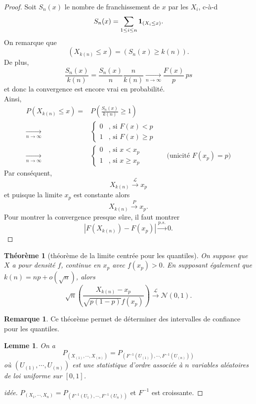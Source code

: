 \documentclass[10p,a4paper,reqno,titlepage]{report}
\newcommand{\indic}{\mathrm{{\bf 1}}}
\newcounter{dader}[chapter]
\theoremstyle{plain}
\newtheorem{thm}[thms]{Théorème}
\newtheorem{lemme}[dader]{Lemme}%
\theoremstyle{definition}
\newtheorem{rem}[dader]{Remarque}
\newcommand{\vabs}[1]{\left\vert #1 \right\vert}
\newcommand{\cvps}{\stackrel{p.s.}{\longrightarrow}}
\newcommand{\cvP}{\stackrel{P}{\longrightarrow}}
\newcommand{\cvloi}{\stackrel{\mathcal{L}}{\longrightarrow}}
\begin{document}
\begin{proof}
	Soit $S_n (x)$ le nombre de franchissement de $x$ par les $X_i$, c-à-d
	$$S_n (x)= \sum_{1\leq i \leq n} \indic_{(X_i \leq x)}.$$
	On remarque que 
	$$ (X_{k(n)}\leq x )= (S_n (x) \geq k (n)).$$
	De plus,
	$$ \frac{S_n (x)}{k(n)}= \frac{S_n(x)}{n}\frac{n}{k(n)}\underset{n\to\infty}{\longrightarrow} \frac{F(x)}{p} \,ps$$
	et donc la convergence est encore vrai en probabilité.\\
	Ainsi,
	\begin{align*}
		P(X_{k(n)} \leq x) = & P\left(\frac{S_n(x)}{k(n)}\geq 1\right)\\
		 \underset{n\to\infty}{\longrightarrow} & \left\{\begin{array}{ll}
		 	0 & \text{, si }F(x)< p \\ 1 & \text{, si }F(x)\geq p
		 \end{array}\right.\\
	 \underset{n\to\infty}{\longrightarrow} & \left\{\begin{array}{ll}
	 	0 & \text{, si }x< x_p \\ 1 & \text{, si }x\geq x_p
	 \end{array}\right. && \text{(unicité $F(x_p)=p$)}
	\end{align*}
Par conséquent,
$$ X_{k(n)} \cvloi x_p$$
et puisque la limite $x_p$ est constante alors 
$$ X_{k(n)} \cvP x_p .$$
Pour montrer la convergence presque sûre, il faut montrer 
$$ \vabs{F(X_{k(n)}) -F(x_p)} \cvps 0.$$
\end{proof}
\begin{thm}[théorème de la limite centrée pour les quantiles]
	On suppose que $X$ a pour densité $f$, continue en $x_p$ avec $f(x_p)>0$. En supposant également que $k(n)= np+o(\sqrt{n})$, alors 
	$$ \sqrt{n} \left(\frac{X_{k(n)}-x_p}{\sqrt{p(1-p)} f(x_p)}\right)\cvloi \mathcal N (0,1).$$
\end{thm}
\begin{rem}
	Ce théorème permet de déterminer des intervalles de confiance pour les quantiles.
\end{rem}
\begin{lemme}
	On a 
	$$P_{(X_(1),\cdots, X_{(n)})} = P_(F^{-1}(U_{(1)}),\cdots,F^{-1}(U_{(n)}))$$
	où $(U_{(1)},\cdots, U_{(n)})$ est une statistique d'ordre associée à $n$ variables aléatoires de loi uniforme sur $[0,1]$.
\end{lemme}
\begin{proof}[idée]
	$P_{(X_1,\cdots, X_{n})} = P_(F^{-1}(U_{1}),\cdots,F^{-1}(U_{n}))$ et $F^{-1}$ est croissante.
\end{proof}
\end{document}
